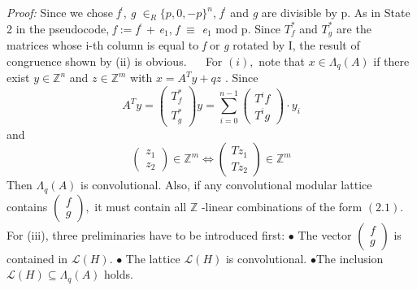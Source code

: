 \emph{Proof: } Since we chose \emph{f}$^'$, \emph{g} $\in_{R}\{p, 0,-p\}^{n}$, \emph{f}$^'$ and \emph{g} are divisible by p. As in State 2 in the pseudocode, \emph{f} := \emph{f}$^'$ + \emph{e}$_1$, \emph{f} $\equiv$ \emph{e}$_1$ mod p. Since $T^*_f$ and $T^*_g$ are the matrices whose i-th column is equal to \emph{f} or \emph{g} rotated by I, the result of congruence shown by (ii) is obvious.
\newline
$\quad$ For $(i),$ note that $x \in \Lambda_{q}(A)$ if there exist $y \in \mathbb{Z}^{n}$ and $z \in \mathbb{Z}^{m}$ with $x=A^{T} y+q z$ . Since\newline
\begin{equation}
    A^{T} y=\left(\begin{array}{c}{T_{f}^{*}} \\ {T_{g}^{*}}\end{array}\right) y=\sum_{i=0}^{n-1}\left(\begin{array}{c}{T^{i} f} \\ {T^{i} g}\end{array}\right) \cdot y_{i}
\end{equation}
and\newline
\begin{equation}
    \left(\begin{array}{l}{z_{1}} \\ {z_{2}}\end{array}\right) \in \mathbb{Z}^{m} \Leftrightarrow\left(\begin{array}{l}{T z_{1}} \\ {T z_{2}}\end{array}\right) \in \mathbb{Z}^{m}
\end{equation}
Then $\Lambda_{q}(A)$ is convolutional. Also, if any convolutional modular lattice contains $\left(\begin{array}{l}{f} \\ {g}\end{array}\right),$ it must contain all $\mathbb{Z}$ -linear combinations of the form $(2.1) .$ For (iii), three preliminaries have to be introduced first: \newline
$\bullet$ The vector $\left(\begin{array}{l}{f} \\ {g}\end{array}\right)$ is contained in $\mathcal{L}(H)$.\newline
$\bullet$ The lattice $\mathcal{L}(H)$ is convolutional.\newline
$\bullet$The inclusion $\mathcal{L}(H) \subseteq \Lambda_{q}(A)$ holds.\newline
